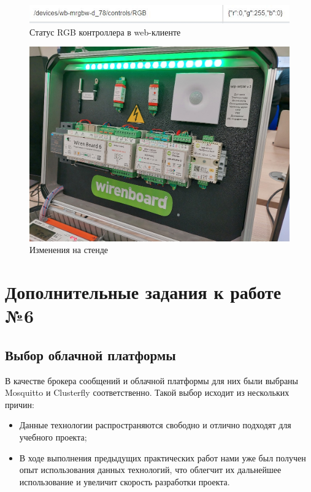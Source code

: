 \documentclass[a4paper,14pt]{extarticle}
\begin{document}
\begin{figure}[htbp]
	\centering
	\includegraphics[width=0.7\linewidth]{images/ssh-powershell4.2}
	\caption{Статус RGB контроллера в web-клиенте}
	\label{fig:ssh-web-client}
\end{figure}


\begin{figure}[htbp]
	\centering
	\includegraphics[width=0.6\linewidth]{images/ssh-powershell4.1}
	\caption{Изменения на стенде}
	\label{fig:ssh-stend}
\end{figure}
\newpage
\section{Дополнительные задания к работе №6}
\subsection{Выбор облачной платформы}
В качестве брокера сообщений и облачной платформы для них были выбраны Mosquitto и Clusterfly соответственно. Такой выбор исходит из нескольких причин:
\begin{itemize}
	\item Данные технологии распространяются свободно и отлично подходят для учебного проекта;
	
	\item В ходе выполнения предыдущих практических работ нами уже был получен опыт использования данных технологий, что облегчит их дальнейшее использование и увеличит скорость разработки проекта.
\end{itemize}
\end{document}

